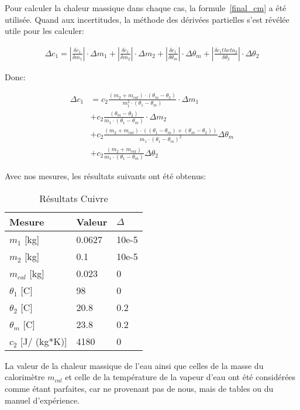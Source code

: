 Pour calculer la chaleur massique dans chaque cas, la formule~\eqref{final_cm} a été utilisée.
Quand aux incertitudes, la méthode des dérivées partielles s'est révélée utile pour les calculer:

\begin{align*}
    \Delta c_1 = |\frac{\delta c_1}{\delta m_1}|\cdot \Delta m_1 + |\frac{\delta c_1}{\delta m_2}|\cdot \Delta m_2 + |\frac{\delta c_1}{\delta \theta_m}|\cdot \Delta \theta_m + |\frac{\delta c_1theta_2}{\delta \theta_2}|\cdot \Delta \theta_2
\end{align*}

Donc:

\begin{align*}
    \Delta c_1 &= c_2 \frac{(m_2 + m_{cal})\cdot (\theta_m - \theta_2)}{m_1^2 \cdot (\theta_1 - \theta_m)}\cdot \Delta m_1\\
    &+ c_2 \frac{(\theta_m - \theta_2)}{m_1\cdot (\theta_1 - \theta_m)}\cdot \Delta m_2\\
    &+ c_2 \frac{(m_2 + m_{cal})\cdot ((\theta_1 - \theta_m)+(\theta_m - \theta_2))}{m_1 \cdot (\theta_1 - \theta_m)^2} \Delta \theta_m\\
    &+ c_2 \frac{(m_2 + m_{cal})}{m_1 \cdot (\theta_1 - \theta_m)}\Delta \theta_2
\end{align*}

Avec nos mesures, les résultats suivants ont été obtenus:

\begin{table}[!h]
    \centering
    \caption{Résultats Cuivre}
    \begin{tabular}{|l|l|l|}
	\hline
	Mesure	&Valeur	&$\Delta$\\
	\hline
	$m_1$ [kg]	&0.0627	&10e-5\\
	$m_2$ [kg]	&0.1	&10e-5\\
	$m_{cal}$ [kg]	&0.023	&0\\
	$\theta_1$ [C\degree]	&98	&0\\
	$\theta_2$ [C\degree]	&20.8	&0.2\\
	$\theta_m$ [C\degree]	&23.8	&0.2\\
	$c_2$ [J/ (kg*K)]	&4180	&0\\
	\hline
    \end{tabular}
\end{table}

La valeur de la chaleur massique de l'eau ainsi que celles de la masse du calorimètre $m_{cal}$ et celle de la température de la vapeur d'eau ont été considérées comme étant parfaites, car ne provenant pas de nous, mais de tables ou du manuel d'expérience.

